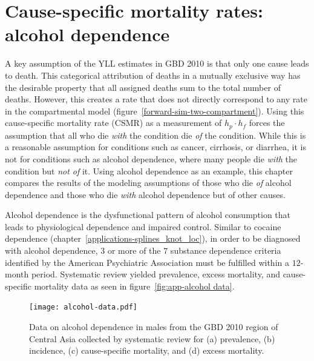 \chapter{Cause-specific mortality rates: alcohol dependence}
\label{applications-csmr}

A key assumption of the YLL estimates in GBD 2010 is that only
one cause leads to death.  This categorical attribution of deaths in
a mutually exclusive way has the desirable property that all assigned
deaths sum to the total number of deaths.  However, this
creates a rate that does not directly correspond to any rate in the
compartmental model (figure~\ref{forward-sim-two-compartment}).  Using this cause-specific mortality rate (CSMR)
as a measurement of $h_p \cdot h_f$ forces the assumption
that all who die \emph{with} the condition die \emph{of} the
condition.  While this is a reasonable assumption for conditions
such as cancer, cirrhosis, or diarrhea, it is not for conditions such as
alcohol dependence, where many people die \emph{with}
the condition but \emph{not of} it.  Using alcohol dependence as an
example, this chapter compares the results of
the modeling assumptions of those who die \emph{of} alcohol dependence
and those who die \emph{with} alcohol dependence but of other causes.

Alcohol dependence is the dysfunctional pattern of alcohol consumption
that leads to physiological dependence and impaired control.  Similar to
cocaine dependence (chapter~\ref{applications-splines_knot_loc}), in order to
be diagnosed with alcohol dependence, $3$ or more of the $7$
substance dependence criteria identified by the American Psychiatric
Association must be
fulfilled within a $12$-month period.
\cite{american_psychiatric_association_diagnostic_2000, hasin_prevalence_2007}
Systematic review yielded prevalence, excess mortality, and
cause-specific mortality data as seen in figure~\ref{fig:app-alcohol
  data}.

    \begin{figure}[h]
        \begin{center}
            \texttt{[image: alcohol-data.pdf]}
            \caption[Systematic review data for alcohol dependence.]{Data on alcohol
              dependence in males from the GBD 2010 region of
              Central Asia collected by systematic review for (a) prevalence, (b) incidence, (c)
              cause-specific mortality, and (d) excess mortality.}
            \label{fig:app-alcohol data}
        \end{center}
    \end{figure}

